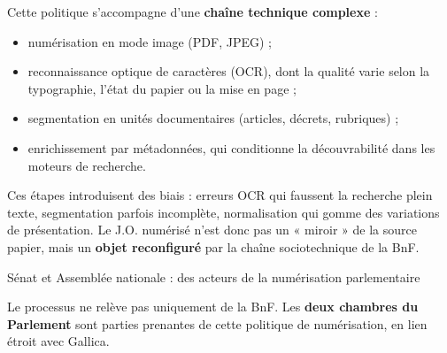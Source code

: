 Cette politique s’accompagne d’une \textbf{chaîne technique complexe} :

\begin{itemize}
\item numérisation en mode image (PDF, JPEG) ;
\item reconnaissance optique de caractères (OCR), dont la qualité varie selon la typographie, l’état du papier ou la mise en page ;
\item segmentation en unités documentaires (articles, décrets, rubriques) ;
\item enrichissement par métadonnées, qui conditionne la découvrabilité dans les moteurs de recherche.

\end{itemize}
Ces étapes introduisent des biais : erreurs OCR qui faussent la recherche plein texte, segmentation parfois incomplète, normalisation qui gomme des variations de présentation. Le J.O. numérisé n’est donc pas un « miroir » de la source papier, mais un \textbf{objet reconfiguré} par la chaîne sociotechnique de la BnF.





 Sénat et Assemblée nationale : des acteurs de la numérisation parlementaire

Le processus ne relève pas uniquement de la BnF. Les \textbf{deux chambres du Parlement} sont parties prenantes de cette politique de numérisation, en lien étroit avec Gallica.

